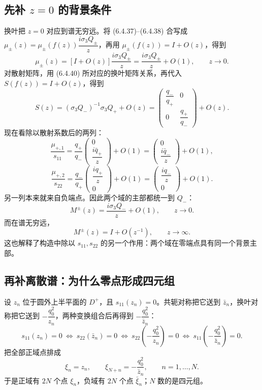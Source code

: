 \documentclass[lang=cn,scheme=chinese,mode=simple,device=normal,color=blue,math=cm,thmcnt=section,12pt]{elegantbook}
\newcommand{\eqq}[2]{\tag{#1}\label{eq:#1}#2}
\begin{document}
\subsection*{先补 \(z=0\) 的背景条件}
换叶把 $z=0$ 对应到谱无穷远。将 (6.4.37)--(6.4.38) 合写成
$\mu_\pm(z)=\mu_\pm(f(z))\dfrac{i\sigma_3Q_\pm}{z}$，再用 $\mu_\pm(f(z))=I+O(z)$，得到
\begin{equation}\eqq{6.4.49}{\mu_\pm(z)
=[I+O(z)]\dfrac{i\sigma_3Q_\pm}{z}
=\dfrac{i\sigma_3Q_\pm}{z}+O(1),\qquad z\to0.}\end{equation}
对散射矩阵，用 (6.4.40) 所对应的换叶矩阵关系，再代入 $S(f(z))=I+O(z)$，得到
\[
S(z)=(\sigma_3Q_-)^{-1}\sigma_3Q_++O(z)
=\begin{pmatrix}\dfrac{q_-}{q_+}&0\\0&\dfrac{q_+}{q_-}\end{pmatrix}+O(z).
\]
现在看除以散射系数后的两列：
\[
\dfrac{\mu_{+,1}}{s_{11}}
=\dfrac{q_+}{q_-}
\begin{pmatrix}0\\\dfrac{i\bar q_+}{z}\end{pmatrix}+O(1)
=\begin{pmatrix}0\\\dfrac{i\bar q_-}{z}\end{pmatrix}+O(1),
\]
\[
\dfrac{\mu_{+,2}}{s_{22}}
=\dfrac{q_-}{q_+}
\begin{pmatrix}\dfrac{iq_+}{z}\\0\end{pmatrix}+O(1)
=\begin{pmatrix}\dfrac{iq_-}{z}\\0\end{pmatrix}+O(1).
\]
另一列本来就来自负端点。因此两个域的主部都统一到 $Q_-$：
\begin{equation}\eqq{6.5.8}{M^\pm(z)=\dfrac{i\sigma_3Q_-}{z}+O(1),
\qquad z\to0.}\end{equation}
而在谱无穷远，
\begin{equation}\eqq{6.5.7}{M^\pm(z)=I+O(z^{-1}),\qquad z\to\infty.}\end{equation}
这也解释了构造中除以 $s_{11},s_{22}$ 的另一个作用：两个域在零端点具有同一个背景主部。

\subsection*{再补离散谱：为什么零点形成四元组}
设 $z_n$ 位于圆外上半平面的 $D^+$，且 $s_{11}(z_n)=0$。共轭对称把它送到 $\bar z_n$，换叶对称把它送到 $-\dfrac{q_0^2}{z_n}$，两种变换组合后再得到 $-\dfrac{q_0^2}{\bar z_n}$：
\begin{equation}\eqq{6.6.1}{s_{11}(z_n)=0
\ \Longleftrightarrow\ s_{22}(\bar z_n)=0
\ \Longleftrightarrow\ s_{22}\!\left(-\dfrac{q_0^2}{z_n}\right)=0
\ \Longleftrightarrow\ s_{11}\!\left(-\dfrac{q_0^2}{\bar z_n}\right)=0.}\end{equation}
把全部正域点排成
\[
\xi_n=z_n,\qquad \xi_{N+n}=-\dfrac{q_0^2}{\bar z_n},
\qquad n=1,\ldots,N.
\]
于是正域有 $2N$ 个点 $\xi_n$，负域有 $2N$ 个点 $\bar\xi_n$；$N$ 数的是四元组。
\end{document}
